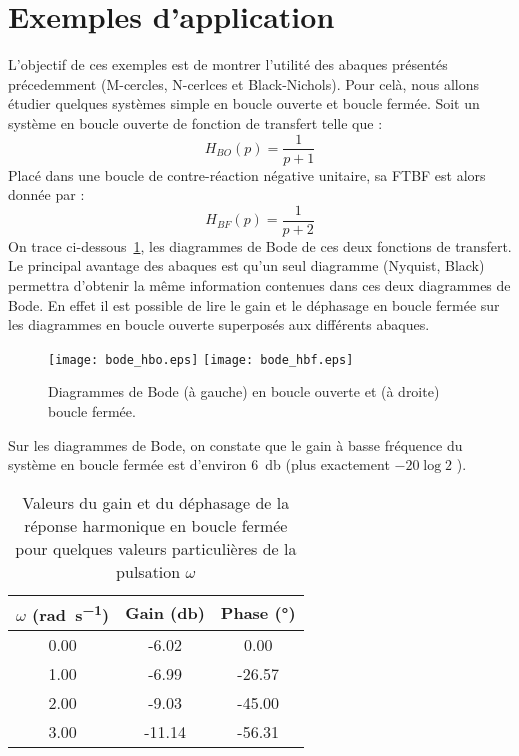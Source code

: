 \section{Exemples d'application}\label{exemples-dapplication}
L'objectif de ces exemples est de montrer l'utilité des abaques présentés 
précedemment (M-cercles, N-cerlces et Black-Nichols). Pour celà, nous allons 
étudier quelques systèmes simple en boucle ouverte et boucle fermée.
Soit un système en boucle ouverte de fonction de transfert telle que :
\[
    H_{BO}(p)=\dfrac{1}{p+1}
\]
Placé dans une boucle de contre-réaction négative unitaire, sa FTBF est alors
donnée par :
\[
    H_{BF}(p)=\dfrac{1}{p+2}
\]
On trace ci-dessous~\cref{fig-exemple1_bodeBlackNichols}, les diagrammes de 
Bode de ces deux fonctions de transfert. Le principal avantage des abaques est 
qu'un seul diagramme (Nyquist, Black) 
permettra d'obtenir la même information contenues dans ces deux 
diagrammes de Bode.
En effet il est possible de lire le gain et le déphasage en boucle fermée
sur les diagrammes en boucle ouverte superposés aux différents abaques.
\begin{figure}[!h]
    \centering
    \texttt{[image: bode\_hbo.eps]}
    \texttt{[image: bode\_hbf.eps]}
    \caption{Diagrammes de Bode (à gauche) en boucle ouverte et (à droite) 
    boucle fermée.\label{fig-exemple1_bodeBlackNichols}}
\end{figure}
Sur les diagrammes de Bode, on constate que le gain à basse fréquence du 
système en boucle fermée est d'environ \SI{6}{\decibel} 
(plus exactement $-20\log{2}$ ). 
\begin{table}
    \centering
    \begin{tabular}{ccc}
    \hline
        $\omega$ (\si{\radian\per\second}) & Gain (\si{\decibel}) & Phase (\si{\degree})\\
    \hline
    0.00 & -6.02 & 0.00\\
    1.00 & -6.99 & -26.57\\
    2.00 & -9.03 & -45.00\\
    3.00 & -11.14 & -56.31\\
    \hline
    \end{tabular}
    \caption{Valeurs du gain et du déphasage de la réponse harmonique
            en boucle fermée pour quelques valeurs particulières de la pulsation
            $\omega$}
\end{table}
